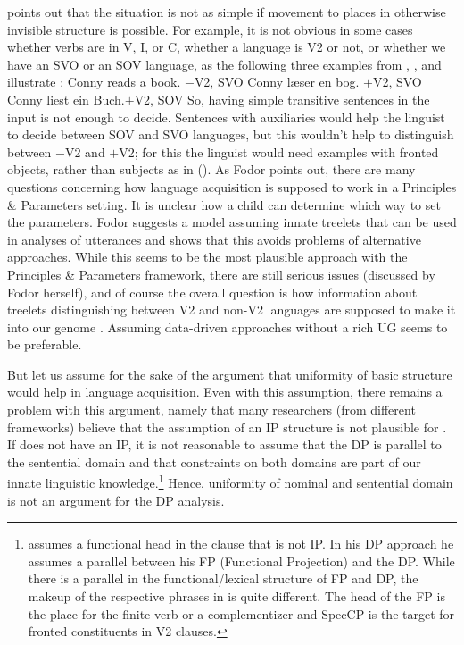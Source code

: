 \documentclass[output=paper
  ,nobabel
  ,draftmode
  ,uniformtopskip %
  ,colorlinks, citecolor=brown
]{langscibook}
\begin{document}
\citet[739]{Fodor2001b} points out that the situation is not as simple if movement to places in
otherwise invisible structure is possible. For example, it is not obvious in some cases whether
verbs are in V, I, or C, whether a language is V2 or not, or whether we have an SVO or an SOV
language, as the following three examples from , , and  illustrate
\citep[Section~6.2.2, Figure~6.11]{MuellerGermanic}:
\eal
\ex Conny reads a book. \hfill $-$V2, SVO
\ex Conny læser en bog. \hfill $+$V2, SVO
\ex Conny liest ein Buch.\hfill $+$V2, SOV
\zl
So, having simple transitive sentences in the input is not enough to decide. Sentences with
auxiliaries would help the linguist to decide between SOV and SVO languages, but this wouldn't help
to distinguish between $-$V2 and $+$V2; for this the linguist would need examples with fronted
objects, rather than subjects as in (). As Fodor
points out, there are many questions concerning
how language acquisition is supposed to work in a Principles \& Parameters setting. It is unclear
how a child can determine which way to set the parameters. Fodor suggests a model assuming innate treelets
that can be used in analyses of utterances and shows that this avoids problems of alternative
approaches. While this seems to be the most plausible approach with the Principles \& Parameters
framework, there are still serious issues (discussed by Fodor herself), and of course the overall
question is how information about treelets distinguishing between V2 and non-V2 languages are
supposed to make it into our genome \citep*{HCF2002a}. Assuming data-driven approaches without a rich
UG \citep{FPAG2007a} seems to be preferable.  
 
But let us assume for the sake of the argument that uniformity of basic \xbar structure
would help in language acquisition. Even with this assumption, there remains a problem with this argument, namely that many
researchers (from different frameworks) believe that the assumption of an IP structure is not plausible for 
\citep{BK90a,Haider93a,Berman2003a}. If  does not have an IP, it is not reasonable to assume
that the DP is parallel to the sentential domain and that constraints on both domains are part of
our innate linguistic knowledge.\footnote{%
  \citet{Haider92b} assumes a functional head in the  clause that is not IP. In his DP approach
  he assumes a parallel between his FP (Functional Projection) and the DP. While there is a parallel in the
  functional/lexical structure of FP and DP, the makeup of the respective phrases in  is quite
  different. The head of the FP is the place for the finite verb or a complementizer and SpecCP is
  the target for fronted constituents in V2 clauses.%
} Hence, uniformity of nominal and sentential domain is not an
argument for the DP analysis.
\end{document}
